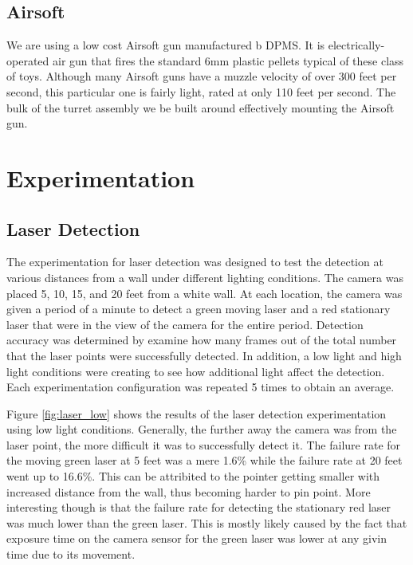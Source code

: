\documentclass[10pt,twocolumn,letterpaper]{article}
\begin{document}
\subsection{Airsoft}

We are using a low cost Airsoft gun manufactured b DPMS. It is electrically-operated air gun that fires the standard 6mm plastic pellets typical of these class of toys. Although many Airsoft guns have a muzzle velocity of over 300 feet per second, this particular one is fairly light, rated at only 110 feet per second. The bulk of the turret assembly we be built around effectively mounting the Airsoft gun.

\section{Experimentation}

\subsection{Laser Detection}

The experimentation for laser detection was designed to test the detection at various distances from a wall under different lighting conditions. The camera was placed 5, 10, 15, and 20 feet from a white wall. At each location, the camera was given a period of a minute to detect a green moving laser and a red stationary laser that were in the view of the camera for the entire period. Detection accuracy was determined by examine how many frames out of the total number that the laser points were successfully detected. In addition, a low light and high light conditions were creating to see how additional light affect the detection. Each experimentation configuration was repeated 5 times to obtain an average.

Figure \ref{fig:laser_low} shows the results of the laser detection experimentation using low light conditions. Generally, the further away the camera was from the laser point, the more difficult it was to successfully detect it. The failure rate for the moving green laser at 5 feet was a mere 1.6\% while the failure rate at 20 feet went up to 16.6\%. This can be attribited to the pointer getting smaller with increased distance from the wall, thus becoming harder to pin point. More interesting though is that the failure rate for detecting the stationary red laser was much lower than the green laser. This is mostly likely caused by the fact that exposure time on the camera sensor for the green laser was lower at any givin time due to its movement.  
\end{document}
